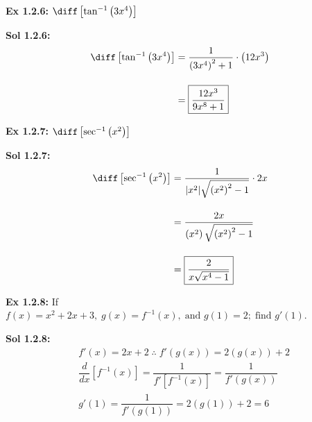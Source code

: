 \begin{tcolorbox}[example]
    \textbf{Ex 1.2.6: } $\diff \left[\tan^{-1} \left(3x^4\right)\right]$ 
\end{tcolorbox}
\begin{tcolorbox}[solution]
    \textbf{Sol 1.2.6: } \begin{align*}
        \diff \left[\tan^{-1} \left(3x^4\right)\right] & = \dfrac{1}{\left(3x^4\right)^2 + 1} \cdot \left(12x^3\right) \\[11pt]
        & = \boxed{\dfrac{12x^3}{9x^8 + 1}}
    \end{align*}
\end{tcolorbox} \vspace{11pt}

\begin{tcolorbox}[example]
    \textbf{Ex 1.2.7: } $\diff \left[\sec^{-1} \left(x^2\right)\right]$ 
\end{tcolorbox}
\begin{tcolorbox}[solution]
        \textbf{Sol 1.2.7: } \begin{align*}
        \diff \left[\sec^{-1} \left(x^2\right)\right] & = \dfrac{1}{|x^2|\sqrt{\left(x^2\right)^2 - 1}} \cdot 2x \\[11pt]
        & = \dfrac{2x}{\left(x^2\right)\sqrt{\left(x^2\right)^2 - 1}} \\[11pt]
        & = \boxed{\dfrac{2}{x\sqrt{x^4 - 1}}}
    \end{align*}
\end{tcolorbox}

\begin{center}
\end{center}

\begin{tcolorbox}[example]
    \textbf{Ex 1.2.8: } If $f(x) = x^2 + 2x + 3, \; g(x) = f^{-1}(x), \; \text{and } g(1) = 2; \; \text{find } g'(1)$. 
\end{tcolorbox}
\begin{tcolorbox}[solution]
    \textbf{Sol 1.2.8: } \begin{align*}
        & f'(x) = 2x + 2 \; \therefore \; f'\left(g(x)\right) = 2\left(g(x)\right) + 2 \\[11pt]
        & \dfrac{d}{dx} \left[f^{-1}(x)\right] = \dfrac{1}{f'\left[f^{-1}(x)\right]} = \dfrac{1}{f'\left(g(x)\right)} \\[11pt]
        & g'(1) = \dfrac{1}{f'\left(g(1)\right)} = 2\left(g(1)\right) + 2 = \boxed{6}
    \end{align*}
\end{tcolorbox}

